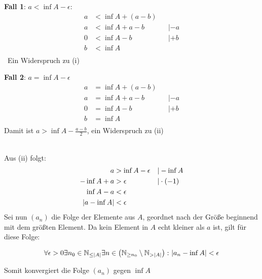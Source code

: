 \documentclass{article}
\begin{document}
\begin{minipage}[t]{.45\textwidth}
  \textbf{Fall 1}: $a < \inf A - \epsilon$:
  \begin{align*}
    a &< \inf A + (a - b) \\
    a &< \inf A + a - b && | -a \\
    0 &< \inf A - b     && | +b \\
    b &< \inf A \\
  \end{align*}\
  Ein Widerspruch zu (i)
\end{minipage}
\begin{minipage}[t]{.45\textwidth}
  \textbf{Fall 2}: $a = \inf A - \epsilon$
  \begin{align*}
    a &= \inf A + (a - b) \\
    a &= \inf A + a - b && | -a \\
    0 &= \inf A - b     && | +b \\
    b &= \inf A \\
  \end{align*}
  Damit ist $a > \inf A - \frac{a - b}{2}$, ein Widerspruch zu (ii)
\end{minipage}
\\
Aus (ii) folgt:
\begin{align*}
  a &> \inf A - \epsilon && | - \inf A \\
  -\inf A + a &> \epsilon && | \cdot (-1) \\
  \inf A - a &< \epsilon \\
  \abs{a - \inf A} &< \epsilon \\ 
\end{align*}
Sei nun $(a_n)$ die Folge der Elemente aus $A$, geordnet nach der Größe beginnend mit dem größten Element.
Da kein Element in $A$ echt kleiner als $a$ ist, gilt für diese Folge:

\[
  \forall \epsilon > 0 \exists n_0 \in \mathbb{N}_{\leq \abs{A}} \exists n \in \left(\mathbb{N}_{\geq n_0} \setminus \mathbb{N}_{> \abs{A}}\right) \colon \abs{a_n - \inf A} < \epsilon
\]

Somit konvergiert die Folge $(a_n)$ gegen $\inf A$
\end{document}
